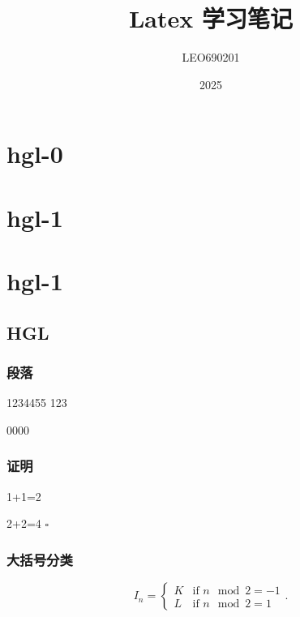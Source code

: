 \documentclass{article}
\title{Latex 学习笔记}
\author{LEO690201}
\date{2025}
\newenvironment{proof}{{\noindent\it 证明}\quad}{\hfill $\square$\par}
\begin{document}
\maketitle


\tableofcontents


\section{hgl-0}


\section{hgl-1}   %


\section*{hgl-1}   %


\subsection{HGL}   %

\subsubsection{段落}   %
1234455   %
123

0000

\subsubsection{证明}

\begin{proof}  %

1+1=2

2+2=4
\end{proof}

\subsubsection{大括号分类}

\[   %
I_n = \begin{cases} 
K & \text{if } n \mod 2 = -1 \\
L & \text{if } n \mod 2 = 1 
\end{cases}.
\]
\end{document}
